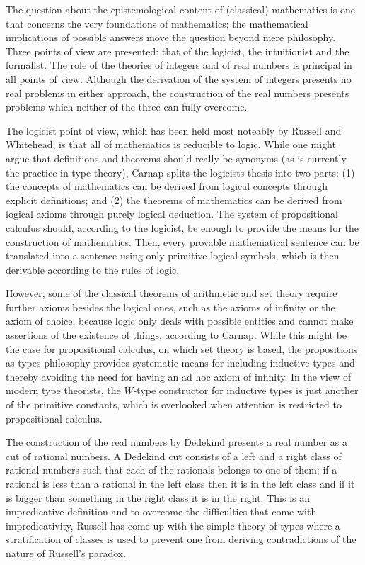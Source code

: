 \documentclass{article}
\begin{document}
\maketitle

The question about the epistemological content of (classical) mathematics is one that 
concerns the very foundations of mathematics; the mathematical implications of
possible answers move the question beyond mere philosophy. Three points of view
are presented: that of the logicist, the intuitionist and the formalist.
The role of the theories of integers and of real numbers is principal in all
points of view. Although the derivation of the system of integers presents no
real problems in either approach, the construction of the real numbers presents
problems which neither of the three can fully overcome.

The logicist point of view, which has been held most noteably by Russell and
Whitehead, is that all of mathematics is reducible to logic. While one might
argue that definitions and theorems should really be synonyms (as is currently the practice
in type theory), Carnap splits the logicists thesis into two parts: (1) the
concepts of mathematics can be derived from logical concepts through explicit
definitions; and (2) the theorems of mathematics can be derived from logical
axioms through purely logical deduction. The system of propositional calculus
should, according to the logicist, be enough to provide the means for the
construction of mathematics. Then, every provable mathematical sentence can be
translated into a sentence using only primitive logical symbols, which is then
derivable according to the rules of logic.

However, some of the classical theorems of arithmetic and set theory require
further axioms besides the logical ones, such as the axioms of infinity or the
axiom of choice, because logic only deals with possible entities and cannot
make assertions of the existence of things, according to Carnap. While this
might be the case for propositional calculus, on which set theory is based,
the propositions as types philosophy provides systematic means for including
inductive types and thereby avoiding the need for having an ad hoc axiom of
infinity. In the view of modern type theorists, the $W$-type constructor for
inductive types is just another of the primitive constants, which is overlooked
when attention is restricted to propositional calculus.

The construction of the real numbers by Dedekind presents a real number as a
cut of rational numbers. A Dedekind cut consists of a left and a right class of
rational numbers such that each of the rationals belongs to one of them; if
a rational is less than a rational in the left class then it is in the left
class and if it is bigger than something in the right class it is in the right.
This is an impredicative definition and to overcome the difficulties that come
with impredicativity, Russell has come up with the simple theory of types where
a stratification of classes is used to prevent one from deriving contradictions
of the nature of Russell's paradox. 
\end{document}
